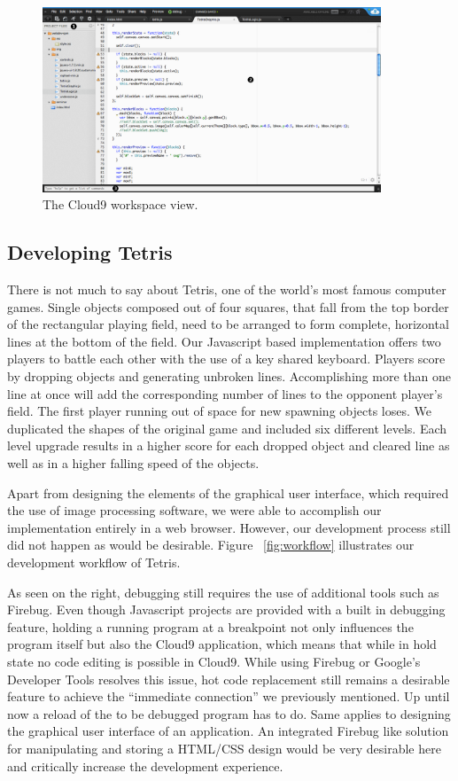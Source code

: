 \begin{figure}
    \centering
    \includegraphics[width=0.9\textwidth]{images/cloud9.png}
    \caption{The Cloud9 workspace view.}
    \label{fig:cloud9}
\end{figure}

\subsection{Developing Tetris}
\label{sec:tetris}
There is not much to say about Tetris, one of the world's most famous computer games. Single objects composed out of four
squares, that fall from the top border of the rectangular playing field, need to be arranged to form complete,
horizontal lines at the bottom of the field.
Our Javascript based implementation offers two players to battle each other with the use of a key shared keyboard.
Players score by dropping objects and generating unbroken lines. Accomplishing more than one line at once will
add the corresponding number of lines to the opponent player's field.
The first player running out of space for new spawning objects loses.
We duplicated the shapes of the original game and included six different levels.
Each level upgrade results in a higher score for each dropped object and cleared line as well as in a higher falling speed of the objects.

Apart from designing the elements of the graphical user interface, which required the use of image processing software,
we were able to accomplish our implementation entirely in a web browser.
However, our development process still did not happen as would be desirable.
Figure ~\ref{fig:workflow} illustrates our development workflow of Tetris.

As seen on the right, debugging still requires the use of additional tools such as Firebug.
Even though Javascript projects are provided with a built in debugging feature,
holding a running program at a breakpoint not only influences the program itself but also the Cloud9 application,
which means that while in hold state no code editing is possible in Cloud9.
While using Firebug or Google's Developer Tools resolves this issue, hot code replacement still remains a desirable
feature to achieve the ``immediate connection'' we previously mentioned.
Up until now a reload of the to be debugged program has to do. Same applies to designing the graphical user interface of
an application.
An integrated Firebug like solution for manipulating and storing a HTML/CSS design would be very desirable
here and critically increase the development experience.

